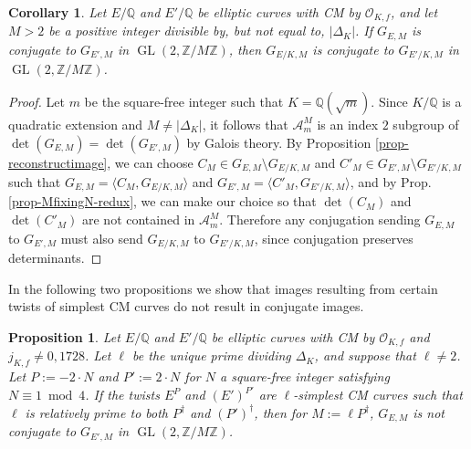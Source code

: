 \documentclass[11pt]{amsart}
\newtheorem{corollary}[defn]{Corollary}
\newtheorem{proposition}[defn]{Proposition}
\theoremstyle{definition}
\newcommand{\Q}{\mathbb{Q}}
\newcommand{\Z}{\mathbb{Z}}
\newcommand{\Of}{\mathcal{O}_{K,f}}
\newcommand{\GL}{\operatorname{GL}}
\begin{document}
\begin{corollary}\label{cor-conjugate-at-cartan}
    Let $E/\Q$ and $E'/\Q$ be elliptic curves with CM by $\Of$, and let $M > 2$ be a positive integer divisible by, but not equal to, $|\Delta_K|$. If $G_{E, M}$ is conjugate to $G_{E', M}$ in $\GL(2, \Z/M\Z)$, then $G_{E/K, M}$ is conjugate to $G_{E'/K, M}$ in $\GL(2, \Z/M\Z)$.
\end{corollary}

\begin{proof}
    Let $m$ be the square-free integer such that $K = \Q(\sqrt{m})$. Since $K/\Q$ is a quadratic extension and $M \neq |\Delta_K|$, it follows that $\mathcal{A}_{m}^{M}$ is an index $2$ subgroup of $\det(G_{E, M}) = \det(G_{E', M})$ by Galois theory. By Proposition \ref{prop-reconstructimage}, we can choose $C_M \in G_{E, M} \setminus G_{E/K, M}$ and $C'_M \in G_{E', M} \setminus G_{E'/K, M}$ such that $G_{E, M} = \langle C_M, G_{E/K, M} \rangle$ and $G_{E', M} = \langle C'_M, G_{E'/K, M} \rangle$, and by Prop. \ref{prop-MfixingN-redux}, we can make our choice so that $\det(C_M)$ and $\det(C'_M)$ are not contained in $\mathcal{A}_{m}^{M}$. Therefore any conjugation sending $G_{E, M}$ to $G_{E', M}$ must also send $G_{E/K, M}$ to $G_{E'/K, M}$, since conjugation preserves determinants.
\end{proof}


In the following two propositions we show that images resulting from certain twists of simplest CM curves do not result in conjugate images.

\begin{proposition}\label{prop-notconjugate-level8}
    Let $E/\Q$ and $E'/\Q$ be elliptic curves with CM by $\Of$ and $j_{K, f} \neq 0, 1728$. Let $\ell$ be the unique prime dividing $\Delta_K$, and suppose that $\ell \neq 2$.  Let $P := -2 \cdot N$ and $P' := 2 \cdot N$ for $N$ a square-free integer satisfying $N \equiv 1 \bmod 4$.     If the twists $E^P$ and $(E')^{P'}$ are $\ell$-simplest CM curves such that $\ell$ is relatively prime to both $P^{\dagger}$ and $(P')^{\dagger}$, then for $M := \ell P^{\dagger}$, $G_{E, M}$ is not conjugate to $G_{E', M}$ in $\GL(2, \Z/ M\Z)$.
\end{proposition}
\end{document}
